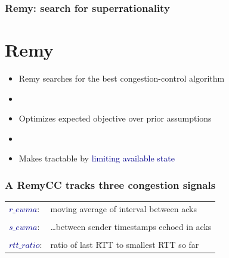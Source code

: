 \documentclass[svgnames]{beamer}
\begin{document}
\begin{frame}
\frametitle{Remy: search for super\textcolor{Black}{rat}ionality}

\section{Remy}

\large

\begin{itemize}

\item Remy searches for the best congestion-control algorithm

\item[]

\item Optimizes expected objective over prior assumptions

\item[]

\item Makes tractable by \textcolor{DarkBlue}{limiting available state}

\end{itemize}

\end{frame}

\begin{frame}
\frametitle{A RemyCC tracks three congestion signals}

\large

\begin{centering}
\noindent \hspace{-0.75 cm}\begin{tabular}{ll}
\textcolor{DarkBlue}{$r\_ewma$}: & moving average of interval between acks \\

\\

\textcolor{DarkBlue}{$s\_ewma$}: & \ldots between sender timestamps echoed in acks \\

\\

\textcolor{DarkBlue}{$rtt\_ratio$}: & ratio of last RTT to smallest RTT so far \\

\end{tabular}

\end{centering}
\end{frame}
\end{document}
